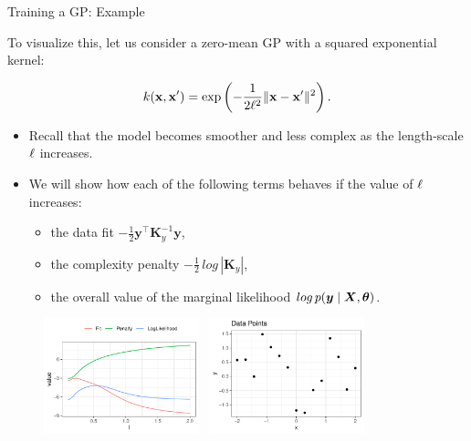\begin{frame}[c,allowframebreaks]{Training a GP: Example}

To visualize this, let us consider a zero-mean GP with a squared exponential kernel:

$$
k(\mathbf{x}, \mathbf{x}^\prime) = \exp\left(-\frac{1}{2\ell^2}\|\mathbf{x} - \mathbf{x}^\prime\|^2\right).
$$


\begin{itemize}
	\item Recall that the model becomes smoother and less complex as the length-scale $\ell$ increases.
	\lz
	\item We will show how each of the following terms behaves if the value of $\ell$ increases:
	\vspace{2mm}
	\begin{itemize}
		\item the data fit $-\frac{1}{2}\bm{y}^\top\bm{K}_y^{-1} \bm{y}$,
		\vspace{2mm}
		\item the complexity penalty $-\frac{1}{2}\,log\,\left| \bm{K}_y \right|$,
		\vspace{2mm}
		\item the overall value of the marginal likelihood $log\,p(\bm{y}\mid\bm{X}, \bm{\theta})$.
	\end{itemize}
\end{itemize}



\framebreak

\begin{figure}
	\includegraphics[width = 0.4\textwidth]{figure_man/training/fit-vs-penalty.pdf}~	\includegraphics[width = 0.4\textwidth]{figure_man/training/datapoints.pdf}
\end{figure}


\end{frame}
